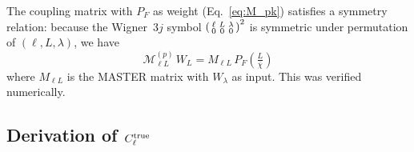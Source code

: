 \documentclass[11pt,a4paper]{article}
\newcommand{\chibar}{\bar{\chi}}
\newcommand{\PF}{P_{\!F}}
\begin{document}
The coupling matrix with $\PF$ as weight (Eq.~\ref{eq:M_pk}) satisfies a
symmetry relation: because the Wigner~3$j$ symbol
$\begin{psmallmatrix}\ell&L&\lambda\\0&0&0\end{psmallmatrix}^2$ is symmetric under
permutation of $(\ell,L,\lambda)$, we have
\begin{equation}
  \boxed{
    \mathcal{M}^{(p)}_{\ell L}\, W_L
    = M_{\ell L}\, \PF\!\left(\tfrac{L}{\chibar}\right)
  }
  \label{eq:identity2}
\end{equation}
where $M_{\ell L}$ is the MASTER matrix with $W_\lambda$ as input.
This was verified numerically.

\subsection{Derivation of $C_\ell^{\rm true}$}
\end{document}
